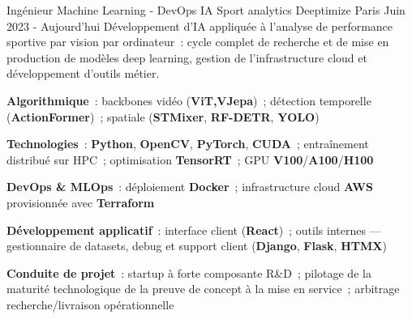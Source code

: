 

\begin{cventries}

	\cventry
	{Ingénieur Machine Learning - DevOps}
	{IA Sport analytics}
	{Deeptimize} %
	{Paris} %
	{Juin 2023 - Aujourd'hui} %
	{Développement d'IA appliquée à l'analyse de performance sportive par vision par ordinateur~: cycle complet de recherche et de mise en production de modèles deep learning, gestion de l'infrastructure cloud et développement d'outils métier.} %
	{
		\begin{cvitems}
			\item{\textbf{Algorithmique}~: backbones vidéo (\textbf{ViT,VJepa})~; détection temporelle (\textbf{ActionFormer})~; spatiale (\textbf{STMixer}, \textbf{RF-DETR}, \textbf{YOLO})}
			\item{\textbf{Technologies}~: \textbf{Python}, \textbf{OpenCV}, \textbf{PyTorch}, \textbf{CUDA}~; entraînement distribué sur HPC~; optimisation \textbf{TensorRT}~; GPU \textbf{V100}\slash\textbf{A100}\slash\textbf{H100}}
			\item{\textbf{DevOps \& MLOps}~: déploiement \textbf{Docker}~; infrastructure cloud \textbf{AWS} provisionnée avec \textbf{Terraform}}
			\item{\textbf{Développement applicatif}~: interface client (\textbf{React})~; outils internes --- gestionnaire de datasets, debug et support client (\textbf{Django}, \textbf{Flask}, \textbf{HTMX})}
			\item{\textbf{Conduite de projet}~: startup à forte composante R\&D~; pilotage de la maturité technologique de la preuve de concept à la mise en service~; arbitrage recherche\slash livraison opérationnelle}
		\end{cvitems}
	}


\end{cventries}
